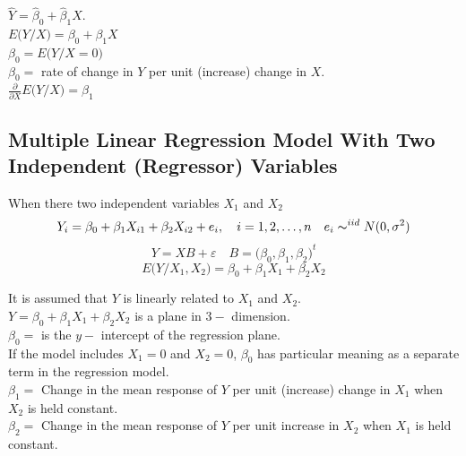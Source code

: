 \documentclass[11pt,a4paper]{article}
\theoremstyle{definition}
\begin{document}
$\widehat{Y}=\widehat{\beta}_0+\widehat{\beta}_1X$.\\

$E\big(Y/X\big)=\beta_0+\beta_1X $\\

$\beta_0=E\big(Y/X=0\big)$\\

$\beta_0=$ rate of change in $Y$ per unit (increase) change in $X$.\\

$\frac{\partial}{\partial X}E\big(Y/X\big)=\beta_1$


\subsection{Multiple Linear Regression Model With Two Independent (Regressor) Variables}
When there two independent variables $X_1$ and $X_2$ 
$$Y_i =\beta_0+\beta_1X_{i1}+\beta_2X_{i2}+e_i,\quad  i=1,2,\ldots ,n\quad  e_i\thicksim^{iid}N(0,\sigma^2)$$
$$Y=XB+\varepsilon\quad  B=\big(\beta_0,\beta_1,\beta_2\big)^t$$
$$E\big(Y/X_1,X_2\big)= \beta_0+\beta_1X_1+\beta_2X_2$$

\begin{figure}[H]
\centering
{}
\end{figure}


It is assumed that $Y$ is linearly related to $X_1$ and $X_2$.\\

$Y=\beta_0+\beta_1X_1+\beta_2X_2$ is a plane in $3-$ dimension.\\
$\beta_0=$ is the $y-$ intercept of the regression plane.\\

If the model includes $X_1=0$ and $X_2=0$, $\beta_0$ has particular meaning as a separate term in the regression model.\\

$\beta_1=$ Change in the  mean response of $Y$ per unit (increase) change in $X_1$ when $X_2$ is held constant.\\
$\beta_2=$ Change in the mean response of $Y$ per unit increase in $X_2$ when $X_1$ is held constant.\\
\end{document}
